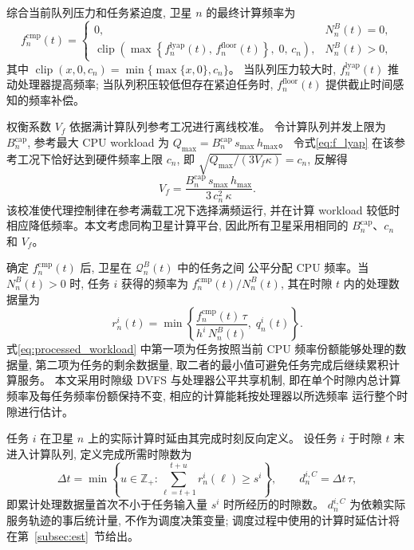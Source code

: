 \documentclass[a4paper,11pt]{article}
\begin{document}
综合当前队列压力和任务紧迫度, 卫星 $n$ 的最终计算频率为
\begin{equation}
    f^{\mathrm{cmp}}_n(t) = \begin{cases}
        0, & N^B_n(t) = 0, \\[1mm]
        \operatorname{clip}\!\left(
            \max\left\{f^{\mathrm{lyap}}_n(t),\, f^{\mathrm{floor}}_n(t)\right\},\;
            0,\, c_n\right), & N^B_n(t) > 0,
    \end{cases}
    \label{eq:f_cmp}
\end{equation}
其中 $\operatorname{clip}(x, 0, c_n) = \min\{\max\{x, 0\}, c_n\}$。
当队列压力较大时, $f^{\mathrm{lyap}}_n(t)$ 推动处理器提高频率;
当队列积压较低但存在紧迫任务时,
$f^{\mathrm{floor}}_n(t)$ 提供截止时间感知的频率补偿。

权衡系数 $V_f$ 依据满计算队列参考工况进行离线校准。
令计算队列并发上限为 $B^{\mathrm{cap}}_n$, 参考最大 CPU workload 为
$Q_{\max} = B^{\mathrm{cap}}_n\, s_{\max}\, h_{\max}$。
令式\eqref{eq:f_lyap} 在该参考工况下恰好达到硬件频率上限 $c_n$,
即 $\sqrt{Q_{\max} / (3 V_f \kappa)} = c_n$, 反解得
\begin{equation}
    V_f = \frac{B^{\mathrm{cap}}_n\, s_{\max}\, h_{\max}}
    {3\, c_n^2\, \kappa}.
    \label{eq:vf_calibration}
\end{equation}
该校准使代理控制律在参考满载工况下选择满频运行, 并在计算
workload 较低时相应降低频率。本文考虑同构卫星计算平台,
因此所有卫星采用相同的 $B^{\mathrm{cap}}_n$、$c_n$ 和 $V_f$。

确定 $f^{\mathrm{cmp}}_n(t)$ 后, 卫星在 $\mathcal{Q}^B_n(t)$ 中的任务之间
公平分配 CPU 频率。当 $N^B_n(t) > 0$ 时, 任务 $i$ 获得的频率为
$f^{\mathrm{cmp}}_n(t) / N^B_n(t)$, 其在时隙 $t$ 内的处理数据量为
\begin{equation}
    r^i_n(t) = \min\!\left\{
        \frac{f^{\mathrm{cmp}}_n(t)\, \tau}{h^i\, N^B_n(t)},\;
        q^i_n(t)\right\}.
    \label{eq:processed_workload}
\end{equation}
式\eqref{eq:processed_workload} 中第一项为任务按照当前 CPU
频率份额能够处理的数据量, 第二项为任务的剩余数据量,
取二者的最小值可避免任务完成后继续累积计算服务。
本文采用时隙级 DVFS 与处理器公平共享机制, 即在单个时隙内总计算
频率及每任务频率份额保持不变, 相应的计算能耗按处理器以所选频率
运行整个时隙进行估计。

任务 $i$ 在卫星 $n$ 上的实际计算时延由其完成时刻反向定义。
设任务 $i$ 于时隙 $t$ 末进入计算队列, 定义完成所需时隙数为
\begin{equation}
    \Delta t = \min\!\left\{
    u \in \mathbb{Z}_+ :
    \sum_{\ell = t+1}^{t + u} r^i_n(\ell) \ge s^i
    \right\},
    \qquad
    d^{i,C}_n = \Delta t\, \tau,
    \label{eq:comp_delay}
\end{equation}
即累计处理数据量首次不小于任务输入量 $s^i$ 时所经历的时隙数。
$d^{i,C}_n$ 为依赖实际服务轨迹的事后统计量, 不作为调度决策变量;
调度过程中使用的计算时延估计将在第~\ref{subsec:est}~节给出。
\end{document}
